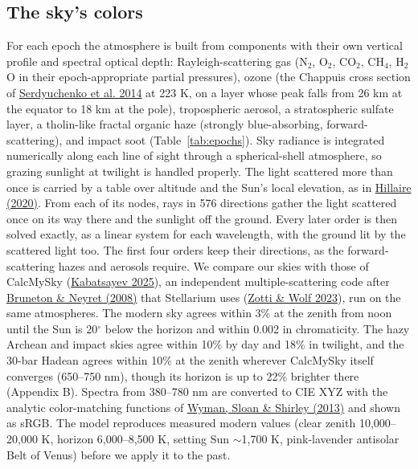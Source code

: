 \documentclass[9pt,twocolumn]{extarticle}
\begin{document}
\subsection{The sky's colors}\label{method-colors}

For each epoch the atmosphere is built from components with their own vertical profile and spectral optical depth: Rayleigh-scattering gas (N$_2$, O$_2$, CO$_2$, CH$_4$, H$_2$O in their epoch-appropriate partial pressures), ozone (the Chappuis cross section of \protect\hyperlink{cite.serdyuchenko2014}{Serdyuchenko et al. 2014} at 223 K, on a layer whose peak falls from 26 km at the equator to 18 km at the pole), tropospheric aerosol, a stratospheric sulfate layer, a tholin-like fractal organic haze (strongly blue-absorbing, forward-scattering), and impact soot (Table~\ref{tab:epochs}). Sky radiance is integrated numerically along each line of sight through a spherical-shell atmosphere, so grazing sunlight at twilight is handled properly. The light scattered more than once is carried by a table over altitude and the Sun's local elevation, as in \protect\hyperlink{cite.hillaire2020}{Hillaire (2020)}. From each of its nodes, rays in 576 directions gather the light scattered once on its way there and the sunlight off the ground. Every later order is then solved exactly, as a linear system for each wavelength, with the ground lit by the scattered light too. The first four orders keep their directions, as the forward-scattering hazes and aerosols require. We compare our skies with those of CalcMySky (\protect\hyperlink{cite.kabatsayev2025}{Kabatsayev 2025}), an independent multiple-scattering code after \protect\hyperlink{cite.bruneton2008}{Bruneton \& Neyret (2008)} that Stellarium uses (\protect\hyperlink{cite.zotti2023}{Zotti \& Wolf 2023}), run on the same atmospheres. The modern sky agrees within 3\% at the zenith from noon until the Sun is 20$^\circ$ below the horizon and within 0.002 in chromaticity. The hazy Archean and impact skies agree within 10\% by day and 18\% in twilight, and the 30-bar Hadean agrees within 10\% at the zenith wherever CalcMySky itself converges (650--750 nm), though its horizon is up to 22\% brighter there (Appendix B). Spectra from 380--780 nm are converted to CIE XYZ with the analytic color-matching functions of \protect\hyperlink{cite.wyman2013}{Wyman, Sloan \& Shirley (2013)} and shown as sRGB. The model reproduces measured modern values (clear zenith 10,000--20,000 K, horizon 6,000--8,500 K, setting Sun $\sim$1,700 K, pink-lavender antisolar Belt of Venus) before we apply it to the past.
\end{document}
